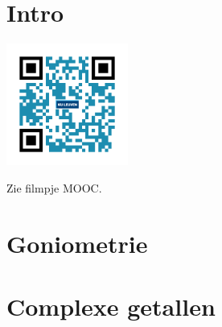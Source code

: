 
\section*{Intro}

\begin{minipage}{.25\linewidth}
	\raggedright
	\includegraphics[width=4cm]{3_gonio_complexe_getallen/inputs/QR_Code_INTRO_module3}
\end{minipage}
\begin{minipage}{.7\linewidth}
	Zie filmpje MOOC.
\end{minipage}

\section{Goniometrie}



\section{Complexe getallen}

